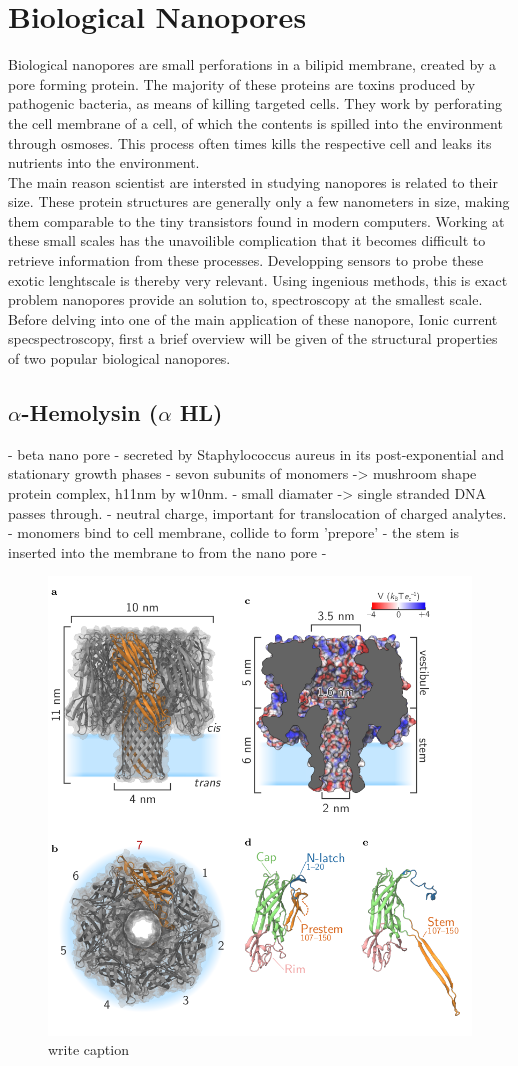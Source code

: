 \section{Biological Nanopores}

Biological nanopores are small perforations in a bilipid membrane, created
by a pore forming protein.  The majority of these proteins are toxins produced by
pathogenic bacteria, as means of killing targeted cells. They work by perforating the
cell membrane of a cell, of which the contents is spilled into the environment through
osmoses. This process often times kills the respective cell and leaks its nutrients into
the environment.\\

The main reason scientist are intersted in studying nanopores is related to their size.
These protein structures are generally only a few nanometers in size, making them
comparable to the tiny transistors found in modern computers. Working at these small
scales has the unavoilible complication that it becomes difficult to retrieve information
from these processes. Developping sensors to probe these exotic lenghtscale is thereby
very relevant. Using ingenious methods, this is exact problem nanopores provide an
solution to, spectroscopy at the smallest scale.\\

Before delving into one of the main application of these nanopore, Ionic current
specspectroscopy, first a brief overview will be given of the structural properties of
two popular biological nanopores.

\subsection{$\alpha$-Hemolysin ($\alpha$ HL)}


- beta nano pore
- secreted by Staphylococcus aureus in its post-exponential and stationary growth phases
- sevon subunits of monomers ->  mushroom shape protein complex, h11nm by w10nm.
- small diamater -> single stranded DNA passes through.
- neutral charge, important for translocation of charged analytes.
- monomers bind to cell membrane, collide to form 'prepore'
- the stem is inserted into the membrane to from the nano pore
-


\begin{figure}[h!]
  \centering
  \includegraphics[width=0.5\linewidth]{Figures/alpha-hemolysin.png}
  \caption{write caption}
  \label{adsf}
\end{figure}


